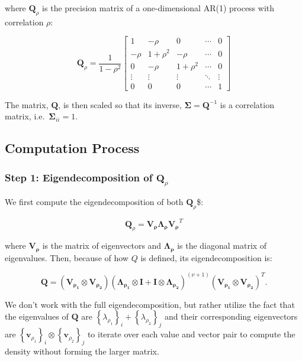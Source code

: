 \documentclass[journal=,manuscript=]{achemso}
\begin{document}
where \(\mathbf{Q}_\rho\) is the precision matrix of a one-dimensional
AR(1) process with correlation \(\rho\):

\[
\mathbf{Q}_\rho = \frac{1}{1-\rho^2}
\begin{bmatrix}
1 & -\rho & 0 & \cdots & 0 \\
-\rho & 1+\rho^2 & -\rho & \cdots & 0 \\
0 & -\rho & 1+\rho^2 & \cdots & 0 \\
\vdots & \vdots & \vdots & \ddots & \vdots \\
0 & 0 & 0 & \cdots & 1
\end{bmatrix}
\]

The matrix, \(\mathbf Q\), is then scaled so that its inverse,
\(\mathbf \Sigma = \mathbf Q^{-1}\) is a correlation matrix,
i.e.~\(\mathbf \Sigma_{ii} = 1\).

\subsection{Computation Process}\label{computation-process}

\subsubsection{\texorpdfstring{Step 1: Eigendecomposition of
\(\mathbf{Q}_{\rho}\)}{Step 1: Eigendecomposition of \textbackslash mathbf\{Q\}\_\{\textbackslash rho\}}}\label{step-1-eigendecomposition-of-mathbfq_rho}

We first compute the eigendecomposition of both \(\mathbf{Q}_{\rho}\)\$:

\[
\mathbf{Q}_{\rho} = \mathbf{V_{\rho}}\mathbf{\Lambda_\rho}\mathbf{V_\rho}^T
\]

where \(\mathbf{V_\rho}\) is the matrix of eigenvectors and
\(\mathbf{\Lambda_\rho}\) is the diagonal matrix of eigenvalues. Then,
because of how \(Q\) is defined, its eigendecomposition is:

\[
\mathbf{Q} = (\mathbf{V_{\rho_1}} \otimes \mathbf{V_{\rho_2}})(\mathbf{\Lambda_{\rho_1}} \otimes \mathbf{I} + \mathbf{I} \otimes \mathbf{\Lambda_{\rho_2}})^{(\nu + 1)}(\mathbf{V_{\rho_1}} \otimes \mathbf{V_{\rho_2}})^T.
\]

We don't work with the full eigendecomposition, but rather utilize the
fact that the eigenvalues of \(\mathbf Q\) are
\(\left\{\lambda_{\rho_1}\right\}_i + \left\{\lambda_{\rho_2}\right\}_j\)
and their corresponding eigenvectors are
\(\left\{\mathbf{v}_{\rho_1}\right\}_i \otimes \left\{\mathbf{v}_{\rho_2}\right\}_j\)
to iterate over each value and vector pair to compute the density
without forming the larger matrix.
\end{document}
